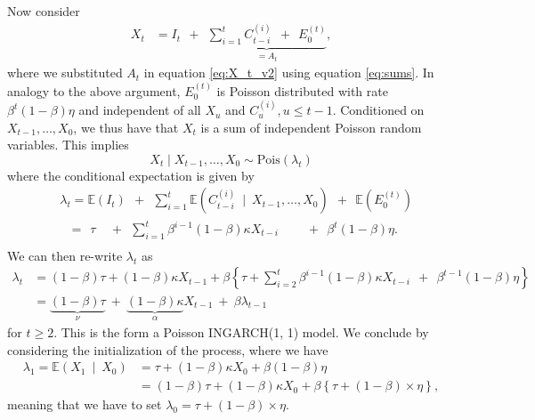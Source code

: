 \documentclass{article}
\begin{document}
Now consider %
\begin{align}
X_t & = I_t \ \ + \ \ \underbrace{\sum_{i = 1}^{t} C_{t - i}^{(i)} \ \ + \ \ E_0^{(t)}}_{= A_t}, \label{eq:decomposition_Xt}
\end{align}
where we substituted $A_t$ in equation \eqref{eq:X_t_v2} using equation \eqref{eq:sums}. In analogy to the above argument, $E_0^{(t)}$ is Poisson distributed with rate $\beta^{t}(1 - \beta)\eta$ and independent of all $X_u$ and $C_u^{(i)}, u \leq t - 1$. Conditioned on $X_{t - 1}, \dots, X_0$, we thus have that $X_t$ is a sum of independent Poisson random variables. This implies
$$
X_t \mid X_{t - 1}, \dots, X_0 \sim \text{Pois}(\lambda_t)
$$
where the conditional expectation is given by
\begin{align*}
& \lambda_t = \mathbb{E}(I_t) \ \ + \ \ \sum_{i = 1}^t \mathbb{E}(C_{t - i}^{(i)} \ \mid \ X_{t- 1}, \dots, X_0) \ \ + \ \ \mathbb{E}(E_0^{(t)})\\
& \ \ \ = \ \ \tau \ \ \ \ \ + \ \ \sum_{i = 1}^t \beta^{i - 1}(1 - \beta)\kappa X_{t - i} \ \ \ \ \ \ \ \ \ \ + \ \ \beta^{t}(1 - \beta)\eta.\\
\end{align*}
We can then re-write $\lambda_t$ as
\begin{align*}
\lambda_t & = (1 - \beta)\tau + (1 - \beta)\kappa X_{t - 1} + \beta \left\{\tau +    \sum_{i = 2}^t \beta^{i - 1}(1 - \beta)\kappa X_{t - i}  \ \ + \ \ \beta^{t - 1}(1 - \beta)\eta\right\}\\
& = \underbrace{(1 - \beta)\tau}_{\nu} \ + \ \underbrace{(1 - \beta)\kappa}_{\alpha} X_{t - 1} \ + \ \beta \lambda_{t - 1}
\end{align*}
for $t \geq 2$. This is the form a Poisson INGARCH(1, 1) model. We conclude by considering the initialization of the process, where we have
\begin{align*}
\lambda_1 = \mathbb{E}(X_1 \ \mid \ X_0) & = \tau + (1 - \beta)\kappa X_0 + \beta(1 - \beta)\eta\\
& =  (1 - \beta)\tau + (1 - \beta)\kappa X_0 + \beta  \left\{\tau + (1 - \beta) \times \eta \right\},
\end{align*}
meaning that we have to set $\lambda_0 =\tau + (1 - \beta) \times \eta$.
\end{document}
